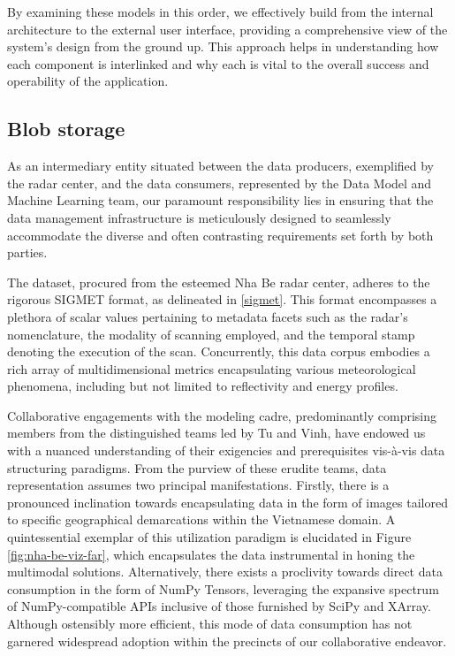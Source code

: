 By examining these models in this order, we effectively build from the internal
architecture to the external user interface, providing a comprehensive view of
the system's design from the ground up. This approach helps in understanding how
each component is interlinked and why each is vital to the overall success and
operability of the application.
\subsection{Blob storage}
As an intermediary entity situated between the data producers, exemplified by
the radar center, and the data consumers, represented by the Data Model and
Machine Learning team, our paramount responsibility lies in ensuring that the
data management infrastructure is meticulously designed to seamlessly
accommodate the diverse and often contrasting requirements set forth by both
parties.

The dataset, procured from the esteemed Nha Be radar center, adheres to the
rigorous SIGMET format, as delineated in \ref{sigmet}. This format encompasses a
plethora of scalar values pertaining to metadata facets such as the radar's
nomenclature, the modality of scanning employed, and the temporal stamp denoting
the execution of the scan. Concurrently, this data corpus embodies a rich array
of multidimensional metrics encapsulating various meteorological phenomena,
including but not limited to reflectivity and energy profiles.

Collaborative engagements with the modeling cadre, predominantly comprising
members from the distinguished teams led by Tu and Vinh, have endowed us with a
nuanced understanding of their exigencies and prerequisites vis-à-vis data
structuring paradigms. From the purview of these erudite teams, data
representation assumes two principal manifestations. Firstly, there is a
pronounced inclination towards encapsulating data in the form of images tailored
to specific geographical demarcations within the Vietnamese domain. A
quintessential exemplar of this utilization paradigm is elucidated in Figure
\ref{fig:nha-be-viz-far}, which encapsulates the data instrumental in honing the
multimodal solutions. Alternatively, there exists a proclivity towards direct
data consumption in the form of NumPy Tensors, leveraging the expansive spectrum
of NumPy-compatible APIs inclusive of those furnished by SciPy and XArray.
Although ostensibly more efficient, this mode of data consumption has not
garnered widespread adoption within the precincts of our collaborative endeavor.

